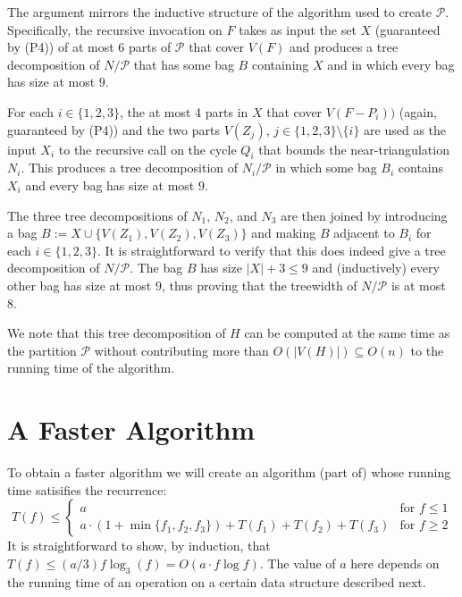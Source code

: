 \documentclass[kpfonts]{patmorin}
\let\le\leqslant
\let\ge\geqslant
\begin{document}
The argument mirrors the inductive structure of the algorithm used to create $\mathcal{P}$.  Specifically, the recursive invocation on $F$ takes as input the set $X$ (guaranteed by (P4)) of at most 6 parts of $\mathcal{P}$ that cover $V(F)$ and produces a tree decomposition of $N/\mathcal{P}$ that has some bag $B$ containing $X$ and in which every bag has size at most $9$.

For each $i\in\{1,2,3\}$, the at most 4 parts in $X$ that cover $V(F-P_i))$ (again, guaranteed by (P4)) and the two parts $V(Z_j)$, $j\in\{1,2,3\}\setminus\{i\}$ are used as the input $X_i$ to the recursive call on the cycle $Q_i$ that bounds the near-triangulation $N_i$. This produces a tree decomposition of $N_i/\mathcal{P}$ in which some bag $B_i$ contains $X_i$ and every bag has size at most $9$.

The three tree decompositions of $N_1$, $N_2$, and $N_3$ are then joined by introducing a bag $B:=X\cup\{V(Z_1),V(Z_2),V(Z_3)\}$ and making $B$ adjacent to $B_i$ for each $i\in\{1,2,3\}$.  It is straightforward to verify that this does indeed give a tree decomposition of $N/\mathcal{P}$.  The bag $B$ has size $|X|+3\le 9$ and (inductively) every other bag has size at most 9, thus proving that the treewidth of $N/\mathcal{P}$ is at most 8.

We note that this tree decomposition of $H$ can be computed at the same time as the partition $\mathcal{P}$ without contributing more than $O(|V(H)|)\subseteq O(n)$ to the running time of the algorithm.

\section{A Faster Algorithm}

To obtain a faster algorithm we will create an algorithm (part of) whose running time satisifies the recurrence:
\[  T(f) \le \begin{cases}
         a & \text{for $f\le 1$} \\
         a\cdot(1+\min\{f_1,f_2,f_3\}) + T(f_1)+T(f_2)+T(f_3) & \text{for $f\ge 2$}
       \end{cases}
\]
It is straightforward to show, by induction, that $T(f)\le (a/3)f\log_3(f)=O(a\cdot f\log f)$.  The value of $a$ here depends on the running time of an operation on a certain data structure described next.
\end{document}
